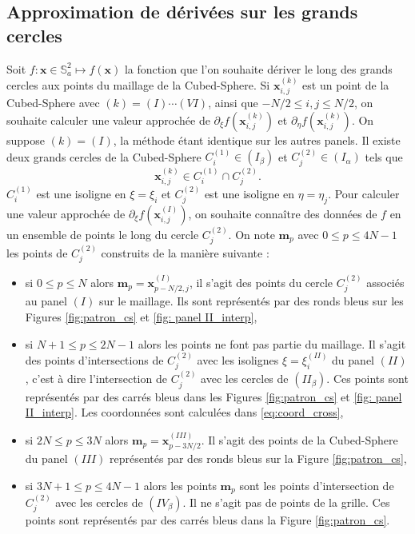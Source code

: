 \subsection{Approximation de dérivées sur les grands cercles}

Soit $f : \mathbf{x}\in \mathbb{S}_a^2 \mapsto f(\mathbf{x})$ la fonction que l'on souhaite dériver le long des grands cercles aux points du maillage de la Cubed-Sphere.
Si $\mathbf{x}_{i,j}^{(k)}$ est un point de la Cubed-Sphere avec $(k) = (I) \cdots (VI)$, ainsi que $-N/2 \leq i,j \leq N/2$, on souhaite calculer une valeur approchée de 
$
\partial_{\xi} f (\mathbf{x}_{i,j}^{(k)})$ et $\partial_{\eta} f (\mathbf{x}_{i,j}^{(k)})$.
On suppose $(k) = (I)$, la méthode étant identique sur les autres panels. Il existe deux grands cercles de la Cubed-Sphere $C_i^{(1)} \in (I_{\beta})$ et $C_j^{(2)} \in (I_{\alpha})$ tels que 
\begin{equation}
\mathbf{x}_{i,j}^{(k)} \in C_i^{(1)} \cap C^{(2)}_j.
\end{equation}
$C^{(1)}_i$ est une isoligne en $\xi = \xi_i$ et $C^{(2)}_j$ est une isoligne en $\eta = \eta_j$.
Pour calculer une valeur approchée de $\partial_{\xi} f (\mathbf{x}_{i,j}^{(I)})$, on souhaite connaître des données de $f$ en un ensemble de points le long du cercle $C^{(2)}_j$. On note $\mathbf{m}_p$ avec $0 \leq p \leq 4N-1$ les points de $C^{(2)}_j$ construits de la manière suivante :
\begin{itemize}
\item si $0 \leq p \leq N$ alors $\mathbf{m}_p = \mathbf{x}^{(I)}_{p-N/2,j}$, il s'agit des points du cercle $C^{(2)}_j$ associés au panel $(I)$ sur le maillage. Ils sont représentés par des ronds bleus sur les Figures \ref{fig:patron_cs} et \ref{fig: panel II_interp},
\item si $N+1 \leq p \leq 2N-1$ alors les points ne font pas partie du maillage. Il s'agit des points d'intersections de $C^{(2)}_j$ avec les isolignes $\xi = \xi_i^{(II)}$ du panel $(II)$, c'est à dire l'intersection de $C^{(2)}_j$ avec les cercles de $(II_{\beta})$. Ces points sont représentés par des carrés bleus dans les Figures \ref{fig:patron_cs} et \ref{fig: panel II_interp}. Les coordonnées sont calculées dans \eqref{eq:coord_cross},
\item si $2N \leq p \leq 3N$ alors $\mathbf{m}_p = \mathbf{x}^{(III)}_{p-3N/2}$. Il s'agit des points de la Cubed-Sphere du panel $(III)$ représentés par des ronds bleus sur la Figure \ref{fig:patron_cs},
\item si $3N+1 \leq p \leq 4N-1$ alors les points $\mathbf{m}_p$ sont les points d'intersection de $C^{(2)}_j$ avec les cercles de $(IV_{\beta})$. Il ne s'agit pas de points de la grille. Ces points sont représentés par des carrés bleus dans la Figure \ref{fig:patron_cs}.
\end{itemize}

